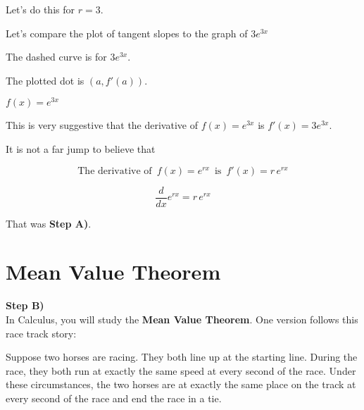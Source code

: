 \documentclass{ximera}
\begin{document}
Let's do this for $r = 3$.

\begin{example}



Let's compare the plot of tangent slopes to the graph of $3 e^{3 x}$


The dashed curve is for $3 e^{3 x}$.

The plotted dot is $(a, f'(a))$.

\begin{example}  $f(x) = e^{3 x}$

\begin{center}
\end{center}

\end{example}





This is very suggestive that the derivative of $f(x) = e^{3 x}$ is $f'(x) = 3 e^{3 x}$.



\end{example}





It is not a far jump to believe that 




\begin{idea}

\[
\text{The derivative of } \, f(x) = e^{r x} \, \text{ is } \, f'(x) = r \, e^{r x}
\]


\[
\frac{d}{dx} e^{r x}  = r \, e^{r x}
\]

\end{idea}



That was \textbf{\textcolor{purple!85!blue}{Step A)}}. \\





\section{Mean Value Theorem}

\textbf{\textcolor{purple!85!blue}{Step B)}} \\

In Calculus, you will study the \textbf{Mean Value Theorem}. One version follows this race track story:


Suppose two horses are racing.  They both line up at the starting line.  During the race, they both run at exactly the same speed at every second of the race.  Under these circumstances, the two horses are at exactly the same place on the track at every second of the race and end the race in a tie.
\end{document}
